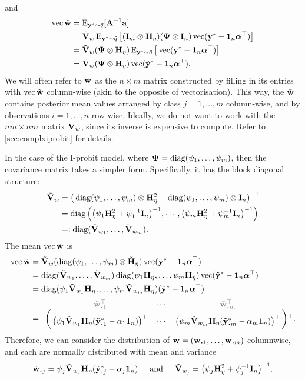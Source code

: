 and 
\begin{align*}
  \operatorname{vec} \tilde{\mathbf w} 
  &= \operatorname{E}_{{\mathbf y}^*\sim \tilde q} [{\mathbf A}^{-1}{\mathbf a}] \\
  &= \tilde{{\mathbf V}}_w \operatorname{E}_{{\mathbf y}^*\sim \tilde q} \big[({\mathbf I}_m \otimes {\mathbf H}_\eta) ({\bm\Psi} \otimes {\mathbf I}_n) \operatorname{vec}({\mathbf y}^* - {\mathbf 1}_n{\bm\alpha}^\top)  \big] \\
  &= \tilde{{\mathbf V}}_w ({\bm\Psi} \otimes {\mathbf H}_\eta) \operatorname{E}_{{\mathbf y}^*\sim \tilde q} \big[\operatorname{vec}({\mathbf y}^* - {\mathbf 1}_n{\bm\alpha}^\top)  \big] \\
  &= \tilde{{\mathbf V}}_w ({\bm\Psi} \otimes {\mathbf H}_\eta) \operatorname{vec}(\tilde{{\mathbf y}}^* - {\mathbf 1}_n{\bm\alpha}^\top).
\end{align*}
We will often refer to $\tilde{{\mathbf w}}$ as the $n\times m$ matrix constructed by filling in its entries with $\operatorname{vec} \tilde{{\mathbf w}}$ column-wise (akin to the opposite of vectorisation).
This way, the $\tilde{{\mathbf w}}$ contains posterior mean values arranged by class $j=1,\dots,m$ column-wise, and by observations $i=1,\dots,n$ row-wise.
Ideally, we do not want to work with the $nm \times nm$ matrix ${\mathbf V}_w$, since its inverse is expensive to compute.
Refer to \cref{sec:complxiprobit} for details.

In the case of the I-probit model, where ${\bm\Psi} = \operatorname{diag}(\psi_1,\dots,\psi_m)$, then the covariance matrix takes a simpler form.
Specifically, it has the block diagonal structure:
\begin{align*}
  \tilde{{\mathbf V}}_w
  &=  \big( \operatorname{diag}(\psi_1,\dots,\psi_m) \otimes {\mathbf H}_\eta^2 + \operatorname{diag}(\psi_1,\dots,\psi_m) \otimes {\mathbf I}_n \big)^{-1} \\
  &= \operatorname{diag}\Big(
  \big( \psi_1{\mathbf H}_\eta^2 + \psi_1^{-1}{\mathbf I}_n\big)^{-1},
  \cdots,
  \big(\psi_m{\mathbf H}_\eta^2 + \psi_m^{-1}{\mathbf I}_n\big)^{-1}
  \Big) \\
  &=: \operatorname{diag}(\tilde{{\mathbf V}}_{w_1},\dots,\tilde{{\mathbf V}}_{w_m}).
  \end{align*}
The mean $\operatorname{vec} \tilde{{\mathbf w}}$ is
\begin{align*}
  \vecc \tilde\bw 
  &= \tilde\bV_w (\diag(\psi_1,\dots,\psi_m) \otimes \tilde\bH_\eta) \vecc(\tilde\by^* - \bone_n\balpha^\top) \\
  &= \diag(\tilde\bV_{w_1},\dots,\tilde\bV_{w_m})
  \diag(\psi_1\bH_\eta,\dots,\psi_m\bH_\eta)  
  \vecc(\tilde\by^* - \bone_n\balpha^\top) \\
  &= \diag(\psi_1\tilde\bV_{w_1}\bH_\eta,\dots,\psi_m\tilde\bV_{w_m}\bH_\eta)  
  (\tilde\by^* - \bone_n\balpha^\top) \\
  &= 
  \bordermatrix{
  &\color{gray}\tilde\bw_{\bigcdot 1}^\top 
  &\color{gray}\cdots 
  &\color{gray}\tilde\bw_{\bigcdot m}^\top \cr
  &\big(\psi_1\tilde\bV_{w_{1}}\bH_\eta(\tilde\by^*_{\bigcdot 1} - \alpha_1\bone_n)\big)^\top
  &\cdots 
  &\big(\psi_m\tilde\bV_{w_{m}}\bH_\eta(\tilde\by^*_{\bigcdot m} - \alpha_m\bone_n)\big)^\top
  }{}^\top.
\end{align*}
Therefore, we can consider the distribution of $\bw = (\bw_{\bigcdot 1},\dots,\bw_{\bigcdot m})$ columnwise, and each are normally distributed with mean and variance
\[
  \tilde\bw_{\bigcdot j} = \psi_j\tilde\bV_{w_{j}}\bH_\eta(\tilde\by^*_{\bigcdot j} - \alpha_j\bone_n)
  \hspace{0.5cm}\text{and}\hspace{0.5cm}
  \tilde\bV_{w_{j}} = \big( \psi_j\bH_\eta^2 + \psi_j^{-1}\bI_n\big)^{-1}.
\]

